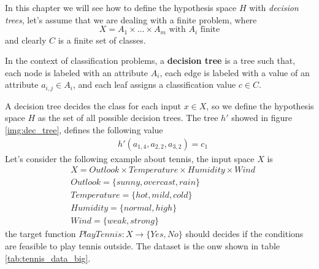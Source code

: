 \documentclass[10pt, letterpaper]{report}
\begin{document}
In this chapter we will see how to define the hypothesis space $H$ with \textit{decision trees}, let's assume that we are dealing with a finite problem, where \begin{equation}
	X=A_1\times \dots \times A_m \text{ with }A_i \text{ finite}
\end{equation}
and clearly $C$ is a finite set of classes.
\begin{definition}
	In the context of classification problems, a \textbf{decision tree} is a tree such that, each node is labeled with an attribute $A_i$, each edge is labeled with a value of an attribute $a_{i,j}\in A_i$, and each leaf assigns a classification value $c\in C$.
\end{definition}
A decision tree decides the class for each input $x\in X$, so we define the hypothesis space $H$ as the set of all possible decision trees.
The tree $h'$ showed in figure \ref{img:dec_tree}, defines the following value\begin{align}
	 & h'(a_{1,4},a_{2,2},a_{3,2})=c_1
\end{align}
Let's consider the following example about tennis, the input space $X$ is\begin{align}
	 & X = Outlook\times Temperature\times Humidity\times Wind \\
	 & Outlook=\{sunny,overcast,rain\}                         \\
	 & Temperature=\{hot,mild,cold\}                           \\
	 & Humidity=\{normal,high\}                                \\
	 & Wind=\{weak,strong\}
\end{align}
the target function $PlayTennis:X\rightarrow\{Yes,No\}$ should decides if the conditions are feasible to play tennis outside. The dataset is the onw shown in table \ref{tab:tennis_data_big}.
\end{document}
